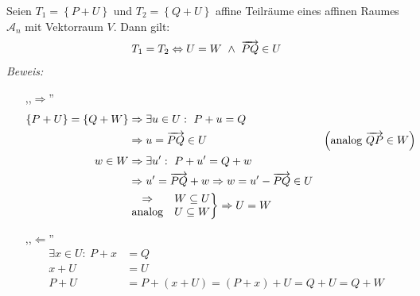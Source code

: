 \begin{mysatz}\medskip

    Seien $T_1 = \left\{ P+U \right\}$ und $T_2 = \left\{ Q+U \right\}$ affine Teilräume eines affinen Raumes $\mathcal{A}_n$ mit Vektorraum $V$. Dann gilt:
    \begin{align*}
        T_1 = T_2 \Leftrightarrow U = W \ \wedge \ \overrightarrow{PQ} \in U
    \end{align*}
    \textit{Beweis:}
    \begin{itemize}
        \item[,,$\Rightarrow$'']
            \begin{align*}
                \left\{ P + U \right\} = \left\{ Q + W \right\} & \Rightarrow \exists u \in U:\ P + u = Q\\
                & \Rightarrow u = \overrightarrow{PQ} \in U & \left( \text{analog } \overrightarrow{QP} \in W \right)\\
                w \in W & \Rightarrow \exists u':\ P + u' = Q + w\\
                & \Rightarrow u' = \overrightarrow{PQ} + w \Rightarrow w = u' - \overrightarrow{PQ} \in U\\
                & \left.
                \begin{matrix}
                    \Rightarrow & W \subseteq U\\
                    \text{analog} & U \subseteq W
                \end{matrix}
                \right\} \Rightarrow U = W
            \end{align*}
        \item[,,$\Leftarrow$'']
            \begin{align*}
                \exists x \in U:\ P + x & = Q\\
                x + U & = U\\
                P + U & = P + \left( x + U \right) = \left( P + x \right) + U = Q + U = Q + W
            \end{align*}
    \end{itemize}
\end{mysatz}

